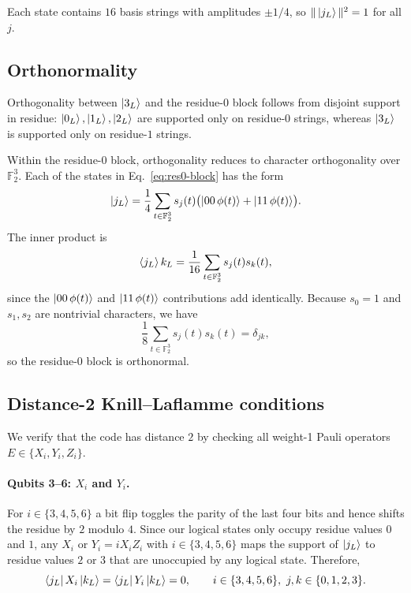 \documentclass[pdflatex,sn-nature]{sn-jnl}%
\theoremstyle{thmstyleone}%
\theoremstyle{thmstyletwo}%
\theoremstyle{thmstylethree}%
\begin{document}
\begin{appendices}
Each state contains $16$ basis strings with amplitudes $\pm 1/4$, so $\|\ket{j_L}\|^2=1$ for all $j$.

\subsection{Orthonormality}

Orthogonality between $\ket{3_L}$ and the residue-$0$ block follows from disjoint support in residue: $\ket{0_L},\ket{1_L},\ket{2_L}$ are supported only on residue-$0$ strings, whereas $\ket{3_L}$ is supported only on residue-$1$ strings.

Within the residue-$0$ block, orthogonality reduces to character orthogonality over $\mathbb{F}_2^3$. Each of the states in Eq.~\eqref{eq:res0-block} has the form
\[
    \ket{j_L}=\frac{1}{4}\sum_{t\in\mathbb F_2^3}s_j(t)\bigl(\ket{00\,\phi(t)}+\ket{11\,\phi(t)}\bigr).
\]
The inner product is
\[
    \braket{j_L}{k_L}
      =\frac{1}{16}\sum_{t\in\mathbb F_2^3} s_j(t)s_k(t),
\]
since the $\ket{00\,\phi(t)}$ and $\ket{11\,\phi(t)}$ contributions add identically. Because $s_0=1$ and $s_1,s_2$ are nontrivial characters, we have
\[
    \frac{1}{8}\sum_{t\in\mathbb F_2^3}s_j(t)s_k(t)=\delta_{jk},
\]
so the residue-$0$ block is orthonormal.

\subsection{Distance-2 Knill--Laflamme conditions}

We verify that the code has distance $2$ by checking all weight-1 Pauli operators $E\in\{X_i,Y_i,Z_i\}$.

\paragraph{Qubits 3--6: $X_i$ and $Y_i$.}
For $i\in\{3,4,5,6\}$ a bit flip toggles the parity of the last four bits and hence shifts the residue by $2$ modulo $4$. Since our logical states only occupy residue values $0$ and $1$, any $X_i$ or $Y_i=iX_i Z_i$ with $i\in\{3,4,5,6\}$ maps the support of $\ket{j_L}$ to residue values $2$ or $3$ that are unoccupied by any logical state. Therefore,
\[
    \bra{j_L}X_i\ket{k_L}
    =\bra{j_L}Y_i\ket{k_L}=0,\qquad
      i\in\{3,4,5,6\},\ j,k\in\{0,1,2,3\}.
\]


\end{appendices}
\end{document}
